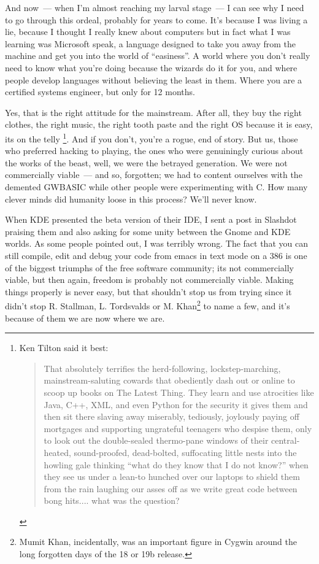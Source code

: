 \documentclass{memoir}
\begin{document}
And now~--- when I'm almost reaching my larval stage~--- I can see why
I need to go through this ordeal, probably for years to come. It's
because I was living a lie, because I thought I really knew about
computers but in fact what I was learning was Microsoft speak, a
language designed to take you away from the machine and get you into
the world of ``easiness''. A world where you don't really need to know
what you're doing because the wizards do it for you, and where people
develop languages without believing the least in them. Where you are a
certified systems engineer, but only for 12 months.

Yes, that is the right attitude for the mainstream. After all, they
buy the right clothes, the right music, the right tooth paste and the
right OS because it is easy, its on the telly
\footnote{Ken Tilton said it best:
  \begin{quote}
    That absolutely terrifies the herd-following, lockstep-marching,
    mainstream-saluting cowards that obediently dash out or online to
    scoop up books on The Latest Thing. They learn and use atrocities
    like Java, C++, XML, and even Python for the security it gives
    them and then sit there slaving away miserably, tediously,
    joylously paying off mortgages and supporting ungrateful teenagers
    who despise them, only to look out the double-sealed thermo-pane
    windows of their central-heated, sound-proofed, dead-bolted,
    suffocating little nests into the howling gale thinking ``what do
    they know that I do not know?'' when they see us under a lean-to
    hunched over our laptops to shield them from the rain laughing our
    asses off as we write great code between bong hits.... what was
    the question?
  \end{quote}
}. And if you don't, you're a rogue, end of story. But us, those who
preferred hacking to playing, the ones who were genuiningly curious
about the works of the beast, well, we were the betrayed
generation. We were not commercially viable~--- and so, forgotten; we
had to content ourselves with the demented GWBASIC while other people
were experimenting with C. How many clever minds did humanity loose in
this process? We'll never know.

When KDE presented the beta version of their IDE, I sent a post in
Slashdot praising them and also asking for some unity between the
Gnome and KDE worlds. As some people pointed out, I was terribly
wrong. The fact that you can still compile, edit and debug your code
from emacs in text mode on a 386 is one of the biggest triumphs of the
free software community; its not commercially viable, but then again,
freedom is probably not commercially viable. Making things properly is
never easy, but that shouldn't stop us from trying since it didn't
stop R. Stallman, L. Tordsvalds or M. Khan\footnote{Mumit Khan,
  incidentally, was an important figure in Cygwin around the long
  forgotten days of the 18 or 19b release.} to name a few, and it's
because of them we are now where we are.
\end{document}
